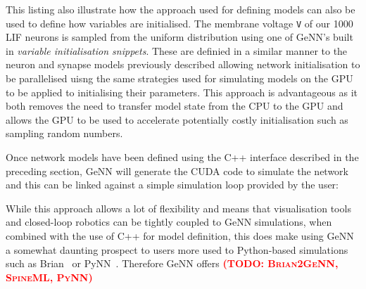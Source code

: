 \documentclass[utf8]{frontiersSCNS} %
\newcommand{\todo}[1]{\textbf{\textsc{\textcolor{red}{(TODO: #1)}}}}
\begin{document}
This listing also illustrate how the approach used for defining models can also be used to define how variables are initialised.
The membrane voltage \lstinline{V} of our \num{1000} LIF neurons is sampled from the uniform distribution using one of GeNN's built in \textit{variable initialisation snippets}.
These are definied in a similar manner to the neuron and synapse models previously described allowing network initialisation to be parallelised uisng the same strategies used for simulating models on the GPU to be applied to initialising their parameters.
This approach is advantageous as it both removes the need to transfer model state from the CPU to the GPU and allows the GPU to be used to accelerate potentially costly initialisation such as sampling random numbers.

Once network models have been defined using the C++ interface described in the preceding section, GeNN will generate the CUDA code to simulate the network and this can be linked against a simple simulation loop provided by the user:



While this approach allows a lot of flexibility and means that visualisation tools and closed-loop robotics can be tightly coupled to GeNN simulations, when combined with the use of C++ for model definition, this does make using GeNN a somewhat daunting prospect to users more used to Python-based simulations such as Brian~\citep{Stimberg2014} or PyNN~\citep{Davison2008a}.
Therefore GeNN offers
\todo{Brian2GeNN, SpineML, PyNN}
\end{document}
